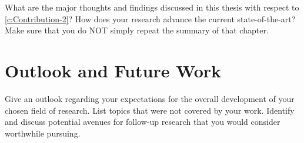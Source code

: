 What are the major thoughts and findings discussed in this thesis with respect to \autoref{c:Contribution-2}? How does your research advance the current state-of-the-art? Make sure that you do NOT simply repeat the summary of that chapter.


\section{Outlook and Future Work}

Give an outlook regarding your expectations for the overall development of your chosen field of research. List topics that were not covered by your work. Identify and discuss potential avenues for follow-up research that you would consider worthwhile pursuing.